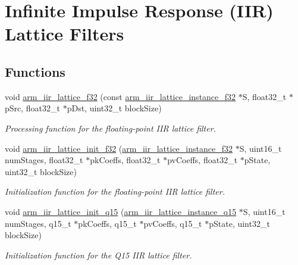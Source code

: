 \hypertarget{group___i_i_r___lattice}{\section{Infinite Impulse Response (I\-I\-R) Lattice Filters}
\label{group___i_i_r___lattice}
}
\subsection*{Functions}
\begin{DoxyCompactItemize}
\item 
void \hyperlink{group___i_i_r___lattice_ga56164a0fe48619b8ceec160347bdd2ff}{arm\-\_\-iir\-\_\-lattice\-\_\-f32} (const \hyperlink{structarm__iir__lattice__instance__f32}{arm\-\_\-iir\-\_\-lattice\-\_\-instance\-\_\-f32} $\ast$S, float32\-\_\-t $\ast$p\-Src, float32\-\_\-t $\ast$p\-Dst, uint32\-\_\-t block\-Size)
\begin{DoxyCompactList}\small\item\em Processing function for the floating-\/point I\-I\-R lattice filter. \end{DoxyCompactList}\item 
void \hyperlink{group___i_i_r___lattice_gaed3b0230bb77439dc902daa625985e04}{arm\-\_\-iir\-\_\-lattice\-\_\-init\-\_\-f32} (\hyperlink{structarm__iir__lattice__instance__f32}{arm\-\_\-iir\-\_\-lattice\-\_\-instance\-\_\-f32} $\ast$S, uint16\-\_\-t num\-Stages, float32\-\_\-t $\ast$pk\-Coeffs, float32\-\_\-t $\ast$pv\-Coeffs, float32\-\_\-t $\ast$p\-State, uint32\-\_\-t block\-Size)
\begin{DoxyCompactList}\small\item\em Initialization function for the floating-\/point I\-I\-R lattice filter. \end{DoxyCompactList}\item 
void \hyperlink{group___i_i_r___lattice_ga1f4bc2dd3d5641e96815d3a5aad58998}{arm\-\_\-iir\-\_\-lattice\-\_\-init\-\_\-q15} (\hyperlink{structarm__iir__lattice__instance__q15}{arm\-\_\-iir\-\_\-lattice\-\_\-instance\-\_\-q15} $\ast$S, uint16\-\_\-t num\-Stages, q15\-\_\-t $\ast$pk\-Coeffs, q15\-\_\-t $\ast$pv\-Coeffs, q15\-\_\-t $\ast$p\-State, uint32\-\_\-t block\-Size)
\begin{DoxyCompactList}\small\item\em Initialization function for the Q15 I\-I\-R lattice filter. \end{DoxyCompactList}\item 

\end{DoxyCompactItemize}

